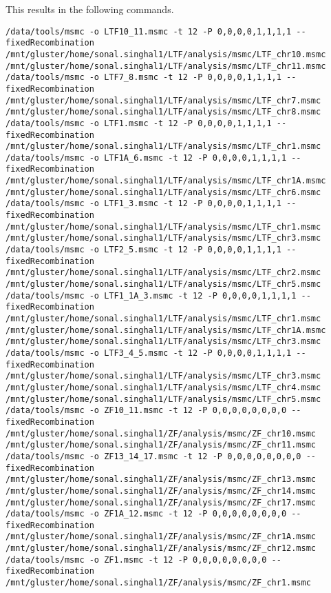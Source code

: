 \documentclass[idxtotoc,hyperref,openany,oneside]{labbook} %
\begin{document}
This results in the following commands.
\begin{verbatim}
/data/tools/msmc -o LTF10_11.msmc -t 12 -P 0,0,0,0,1,1,1,1 --fixedRecombination /mnt/gluster/home/sonal.singhal1/LTF/analysis/msmc/LTF_chr10.msmc /mnt/gluster/home/sonal.singhal1/LTF/analysis/msmc/LTF_chr11.msmc
/data/tools/msmc -o LTF7_8.msmc -t 12 -P 0,0,0,0,1,1,1,1 --fixedRecombination /mnt/gluster/home/sonal.singhal1/LTF/analysis/msmc/LTF_chr7.msmc /mnt/gluster/home/sonal.singhal1/LTF/analysis/msmc/LTF_chr8.msmc 
/data/tools/msmc -o LTF1.msmc -t 12 -P 0,0,0,0,1,1,1,1 --fixedRecombination /mnt/gluster/home/sonal.singhal1/LTF/analysis/msmc/LTF_chr1.msmc 
/data/tools/msmc -o LTF1A_6.msmc -t 12 -P 0,0,0,0,1,1,1,1 --fixedRecombination /mnt/gluster/home/sonal.singhal1/LTF/analysis/msmc/LTF_chr1A.msmc /mnt/gluster/home/sonal.singhal1/LTF/analysis/msmc/LTF_chr6.msmc 
/data/tools/msmc -o LTF1_3.msmc -t 12 -P 0,0,0,0,1,1,1,1 --fixedRecombination /mnt/gluster/home/sonal.singhal1/LTF/analysis/msmc/LTF_chr1.msmc /mnt/gluster/home/sonal.singhal1/LTF/analysis/msmc/LTF_chr3.msmc
/data/tools/msmc -o LTF2_5.msmc -t 12 -P 0,0,0,0,1,1,1,1 --fixedRecombination /mnt/gluster/home/sonal.singhal1/LTF/analysis/msmc/LTF_chr2.msmc /mnt/gluster/home/sonal.singhal1/LTF/analysis/msmc/LTF_chr5.msmc
/data/tools/msmc -o LTF1_1A_3.msmc -t 12 -P 0,0,0,0,1,1,1,1 --fixedRecombination /mnt/gluster/home/sonal.singhal1/LTF/analysis/msmc/LTF_chr1.msmc /mnt/gluster/home/sonal.singhal1/LTF/analysis/msmc/LTF_chr1A.msmc /mnt/gluster/home/sonal.singhal1/LTF/analysis/msmc/LTF_chr3.msmc
/data/tools/msmc -o LTF3_4_5.msmc -t 12 -P 0,0,0,0,1,1,1,1 --fixedRecombination /mnt/gluster/home/sonal.singhal1/LTF/analysis/msmc/LTF_chr3.msmc /mnt/gluster/home/sonal.singhal1/LTF/analysis/msmc/LTF_chr4.msmc /mnt/gluster/home/sonal.singhal1/LTF/analysis/msmc/LTF_chr5.msmc 
/data/tools/msmc -o ZF10_11.msmc -t 12 -P 0,0,0,0,0,0,0,0 --fixedRecombination /mnt/gluster/home/sonal.singhal1/ZF/analysis/msmc/ZF_chr10.msmc /mnt/gluster/home/sonal.singhal1/ZF/analysis/msmc/ZF_chr11.msmc
/data/tools/msmc -o ZF13_14_17.msmc -t 12 -P 0,0,0,0,0,0,0,0 --fixedRecombination /mnt/gluster/home/sonal.singhal1/ZF/analysis/msmc/ZF_chr13.msmc /mnt/gluster/home/sonal.singhal1/ZF/analysis/msmc/ZF_chr14.msmc /mnt/gluster/home/sonal.singhal1/ZF/analysis/msmc/ZF_chr17.msmc 
/data/tools/msmc -o ZF1A_12.msmc -t 12 -P 0,0,0,0,0,0,0,0 --fixedRecombination /mnt/gluster/home/sonal.singhal1/ZF/analysis/msmc/ZF_chr1A.msmc /mnt/gluster/home/sonal.singhal1/ZF/analysis/msmc/ZF_chr12.msmc
/data/tools/msmc -o ZF1.msmc -t 12 -P 0,0,0,0,0,0,0,0 --fixedRecombination /mnt/gluster/home/sonal.singhal1/ZF/analysis/msmc/ZF_chr1.msmc

\end{verbatim}
\end{document}
